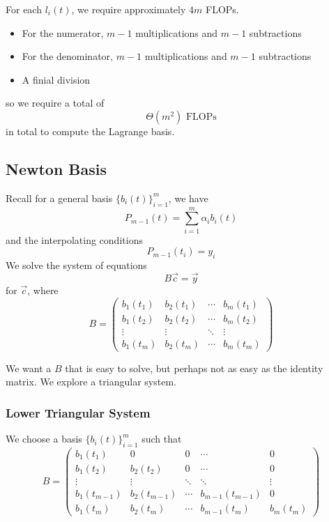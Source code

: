\begin{remark}
    For each \( l_i(t) \), we require approximately \( 4m \) FLOPs.
    \begin{itemize}
        \item For the numerator, \( m - 1 \) multiplications and \( m - 1 \) subtractions
        \item For the denominator, \( m - 1 \) multiplications and \( m - 1 \) subtractions
        \item A finial division
    \end{itemize} so we require a total of \[
        \Theta(m^2) \text{ FLOPs}
    \] in total to compute the Lagrange basis.
\end{remark}

\subsection{Newton Basis}

Recall for a general basis \( \{ b_i(t) \}_{i=1}^{m} \), we have \[
    P_{m-1}(t) = \sum_{i=1}^{m} \alpha_i b_i(t)
\] and the interpolating conditions \[
    P_{m-1}(t_i) = y_i
\] We solve the system of equations \[
    B\vec{c} = \vec{y}
\] for \( \vec{c} \), where \[
    B = \begin{pmatrix}
        b_1(t_1) & b_2(t_1) & \cdots & b_m(t_1) \\
        b_1(t_2) & b_2(t_2) & \cdots & b_m(t_2) \\
        \vdots   & \vdots   & \ddots & \vdots   \\
        b_1(t_m) & b_2(t_m) & \cdots & b_m(t_m)
    \end{pmatrix}
\]

We want a \( B \) that is easy to solve, but perhaps not as easy as the identity matrix. We explore a triangular system.

\subsubsection{Lower Triangular System}

We choose a basis \( \{ b_i(t) \}_{i=1}^{m} \) such that \[
    B = \begin{pmatrix}
        b_1(t_1)     & 0            & 0      & \cdots           & 0        \\
        b_1(t_2)     & b_2(t_2)     & 0      & \cdots           & 0        \\
        \vdots       & \vdots       & \ddots & \ddots           & \vdots   \\
        b_1(t_{m-1}) & b_2(t_{m-1}) & \cdots & b_{m-1}(t_{m-1}) & 0        \\
        b_1(t_m)     & b_2(t_m)     & \cdots & b_{m-1}(t_m)     & b_m(t_m)
    \end{pmatrix}
\]

